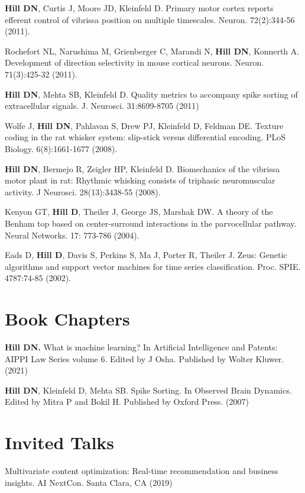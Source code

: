 \documentclass[line,11pt]{res}
\begin{document}
\begin{resume}
\textbf{Hill DN}, Curtis J, Moore JD, Kleinfeld D.  Primary motor cortex reports efferent control of vibrissa position on multiple timescales. Neuron. 72(2):344-56 (2011).

Rochefort NL, Narushima M, Grienberger C, Marandi N, \textbf{Hill DN}, Konnerth A. Development of direction selectivity in mouse cortical neurons. Neuron. 71(3):425-32 (2011). 

\textbf{Hill DN}, Mehta SB, Kleinfeld D.  Quality metrics to accompany spike sorting of extracellular signals. J. Neurosci. 31:8699-8705 (2011)

Wolfe J, \textbf{Hill DN}, Pahlavan S, Drew PJ, Kleinfeld D, Feldman DE. Texture coding in the rat whisker system: slip-stick versus differential encoding. PLoS Biology. 6(8):1661-1677 (2008). 

\textbf{Hill DN}, Bermejo R, Zeigler HP, Kleinfeld D. Biomechanics of the vibrissa motor plant in rat: Rhythmic whisking consists of triphasic neuromuscular activity. J Neurosci. 28(13):3438-55 (2008). 

Kenyon GT, \textbf{Hill D}, Theiler J, George JS, Marshak DW. A theory of the Benham top based on center-surround interactions in the parvocellular pathway. Neural Networks. 17: 773-786 (2004). 

Eads D, \textbf{Hill D}, Davis S, Perkins S, Ma J, Porter R, Theiler J. Zeus: Genetic algorithms and support vector machines for time series classification. Proc. SPIE. 4787:74-85 (2002).

\section{Book Chapters}
\vspace{0.1in}

\textbf{Hill DN.} What is machine learning? In Artificial Intelligence and Patents: AIPPI Law Series volume 6. Edited by J Osha. Published by Wolter Kluwer. (2021)

\textbf{Hill DN}, Kleinfeld D, Mehta SB. Spike Sorting. In Observed Brain Dynamics. Edited by Mitra P and Bokil H. Published by Oxford Press. (2007)

\section{Invited Talks}
\vspace{0.1in}

Multivariate content optimization: Real-time recommendation and business insights. AI NextCon. Santa Clara, CA (2019)


\end{resume}
\end{document}

